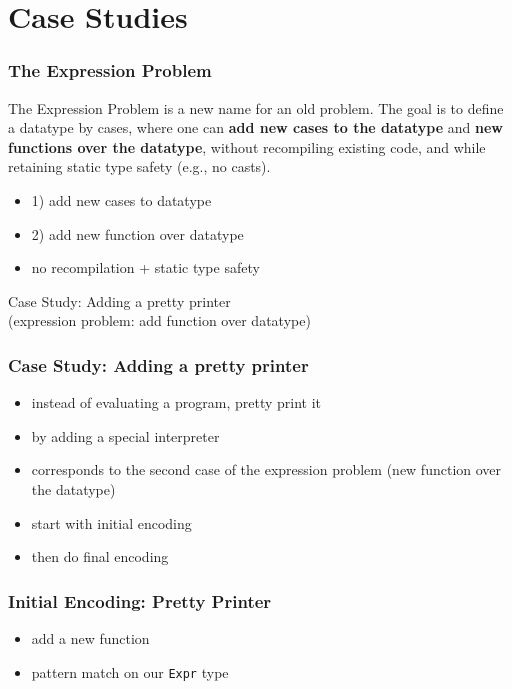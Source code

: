 \documentclass[aspectratio=169, hyperref={colorlinks, linkcolor=beamer@centricgreen}, urlcolor=links]{beamer}
\begin{document}
\section{Case Studies}\label{sec:case-studies}

\begin{frame}
  \frametitle{The Expression Problem}
  \begin{tcolorbox}[
    fonttitle=\sffamily\bfseries,
    colbacktitle=black,
    colframe=black,
    coltitle=beamer@centricgreen,
    title=Philip Wadler on 12. November 1998
    ]
    The Expression Problem is a new name for an old problem.  The goal
    is to define a datatype by cases, where one can \textbf{add new
      cases to the datatype} and \textbf{new functions over the
      datatype}, without recompiling existing code, and while
    retaining static type safety (e.g., no casts).
  \end{tcolorbox}
  \begin{itemize}
  \item 1) add new cases to datatype
  \item 2) add new function over datatype
  \item no recompilation + static type safety
  \end{itemize}
\end{frame}

\begin{frame}
  \begin{center}
    {
      \Huge
      Case Study: Adding a pretty printer\\
    }
    (expression problem: add function over datatype)
  \end{center}
\end{frame}

\begin{frame}
  \frametitle{Case Study: Adding a pretty printer}
  \begin{itemize}
  \item instead of evaluating a program, pretty print it
  \item by adding a special interpreter
  \item corresponds to the second case of the expression problem (new function over the datatype)
  \item start with initial encoding
  \item then do final encoding
  \end{itemize}
\end{frame}

\begin{frame}
  \frametitle{Initial Encoding: Pretty Printer}
  \begin{itemize}
  \item add a new function
  \item pattern match on our \texttt{Expr} type
  \end{itemize}
\end{frame}
\end{document}

